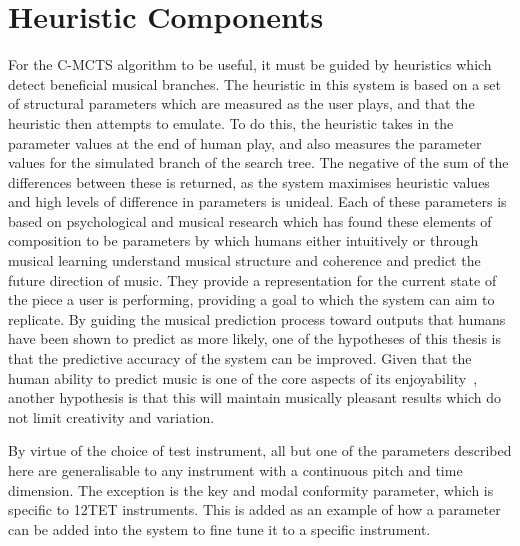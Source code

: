 \section{Heuristic Components}
For the C-MCTS algorithm to be useful, it must be guided by heuristics which detect beneficial musical branches. The heuristic in this system is based on a set of structural parameters which are measured as the user plays, and that the heuristic then attempts to emulate. To do this, the heuristic takes in the parameter values at the end of human play, and also measures the parameter values for the simulated branch of the search tree. The negative of the sum of the differences between these is returned, as the system maximises heuristic values and high levels of difference in parameters is unideal. Each of these parameters is based on psychological and musical research which has found these elements of composition to be parameters by which humans either intuitively or through musical learning understand musical structure and coherence and predict the future direction of music. They provide a representation for the current state of the piece a user is performing, providing a goal to which the system can aim to replicate. By guiding the musical prediction process toward outputs that humans have been shown to predict as more likely, one of the hypotheses of this thesis is that the predictive accuracy of the system can be improved. Given that the human ability to predict music is one of the core aspects of its enjoyability~\citep{Huron2008PsychOfExpectation}, another hypothesis is that this will maintain musically pleasant results which do not limit creativity and variation.

By virtue of the choice of test instrument, all but one of the parameters described here are generalisable to any instrument with a continuous pitch and time dimension. The exception is the key and modal conformity parameter, which is specific to 12TET instruments. This is added as an example of how a parameter can be added into the system to fine tune it to a specific instrument.


